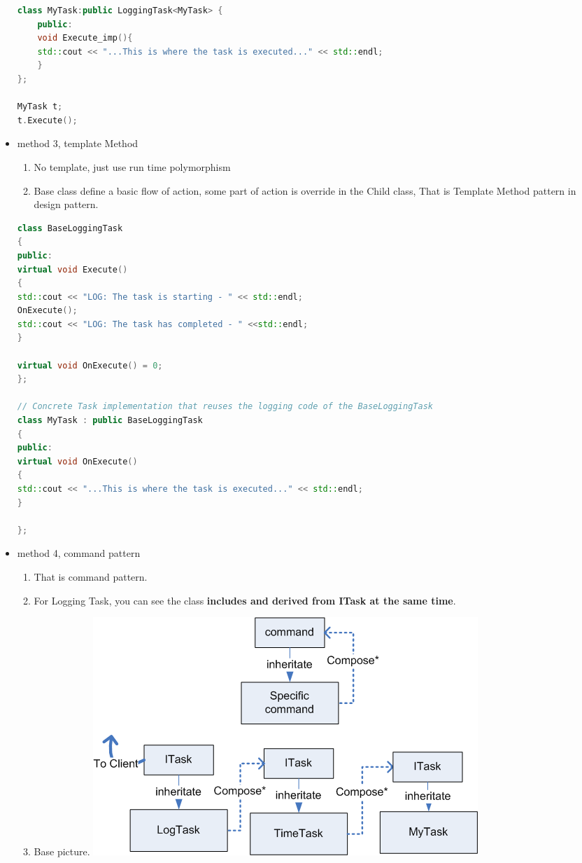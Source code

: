 \documentclass[a4paper,12pt,twoside]{book}
\begin{document}
\begin{itemize}
\begin{lstlisting}[frame=single, language=c++]
class MyTask:public LoggingTask<MyTask> {
	public:
	void Execute_imp(){
	std::cout << "...This is where the task is executed..." << std::endl;
	}
};

MyTask t;
t.Execute();
\end{lstlisting}

	\item method 3, template Method
\begin{enumerate}
	\item No template, just use run time polymorphism
	\item Base class define a basic flow of action, some part of action is override in the Child class, That is Template Method pattern in design pattern.
\end{enumerate}
\begin{lstlisting}[frame=single, language=c++]
class BaseLoggingTask
{
public:
virtual void Execute()
{
std::cout << "LOG: The task is starting - " << std::endl;
OnExecute();
std::cout << "LOG: The task has completed - " <<std::endl;
}

virtual void OnExecute() = 0;
};

// Concrete Task implementation that reuses the logging code of the BaseLoggingTask
class MyTask : public BaseLoggingTask
{
public:
virtual void OnExecute()
{
std::cout << "...This is where the task is executed..." << std::endl;
}

};
\end{lstlisting}

	\item method 4, command pattern
\begin{enumerate}
	\item That is command pattern.
	\item For Logging Task, you can see the class \textbf{includes and derived from ITask at the same time}. 
	\item Base picture.
	\includegraphics[scale=0.6]{pics/command.png}
	

\end{enumerate}
\end{itemize}
\end{document}
